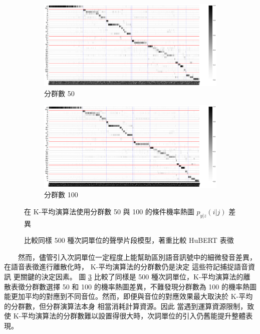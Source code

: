 {{
    {
        \begin{figure}
             \centering
             \begin{subfigure}{\textwidth}
                 \centering
                 \includegraphics[width=1\linewidth]{feasiblefigs/ch4figs/hub-u050-ap0500-givenunit-byphn.png}
                 \caption{分群數 50}
                 \label{fig:hub-u050-ap0500-givenunit-byphn--picked}
             \end{subfigure}
             \vfill
             \begin{subfigure}{\textwidth}
                 \centering
                 \includegraphics[width=1\linewidth]{feasiblefigs/ch4figs/hub-u050-ap1000-givenunit-byphn.png}
                 \caption{分群數 100}
                 \label{fig:hub-u100-ap0500-givenunit-byphn--picked}
             \end{subfigure}
             \caption{比較同樣 500 種次詞單位的聲學片段模型，著重比較 HuBERT 表徵}
             在 K-平均演算法使用分群數 50 與 100 的條件機率熱圖 $p_{y|z}(i|j)$ 差異
             \label{fig:check-ap0500}
        \end{figure}
    }
}

　　然而，儘管引入次詞單位一定程度上能幫助區別語音訊號中的細微發音差異，
在語音表徵進行離散化時，
K-平均演算法的分群數仍是決定
這些符記捕捉語音資訊
更關鍵的決定因素。
圖 \ref{fig:check-ap0500} 比較了同樣是 500 種次詞單位，K-平均演算法的離散表徵分群數選擇 50 和 100 的機率熱圖差異，不難發現分群數為 100 的機率熱圖能更加平均的對應到不同音位。然而，即便與音位的對應效果最大取決於 K-平均的分群數，但分群演算法本身
相當消耗計算資源。因此
當遇到運算資源限制，致使 K-平均演算法的分群數難以設置得很大時，次詞單位的引入仍舊能提升整體表現。

}
